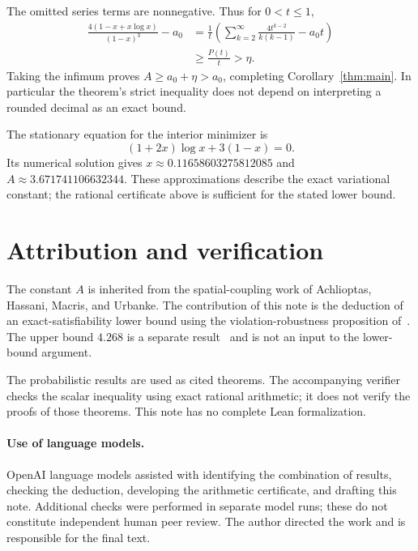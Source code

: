 \documentclass[11pt]{article}
\begin{document}
The omitted series terms are nonnegative. Thus for $0<t\le1$,
\begin{align*}
 \frac{4(1-x+x\log x)}{(1-x)^3}-a_0
 &=\frac1t\left(
       \sum_{k=2}^{\infty}\frac{4t^{k-2}}{k(k-1)}-a_0t\right)\\
 &\ge\frac{P(t)}t>\eta.
\end{align*}
Taking the infimum proves $A\ge a_0+\eta>a_0$, completing
Corollary~\ref{thm:main}. In particular the theorem's strict inequality
does not depend on interpreting a rounded decimal as an exact bound.

The stationary equation for the interior minimizer is
\[
 (1+2x)\log x+3(1-x)=0.
\]
Its numerical solution gives $x\approx0.11658603275812085$ and
$A\approx3.671741106632344$. These approximations describe the exact
variational constant; the rational certificate above is sufficient
for the stated lower bound.

\section{Attribution and verification}
The constant $A$ is inherited from the spatial-coupling work of
Achlioptas, Hassani, Macris, and Urbanke. The contribution of this note
is the deduction of an exact-satisfiability lower bound using the
violation-robustness proposition of~\cite{OpenAI}. The upper bound
$4.268$ is a separate result~\cite{Vorobyev} and is not an input to
the lower-bound argument.

The probabilistic results are used as cited theorems. The accompanying
verifier checks the scalar inequality using exact rational arithmetic;
it does not verify the proofs of those theorems. This note has no
complete Lean formalization.

\paragraph{Use of language models.}
OpenAI language models assisted with identifying the combination of
results, checking the deduction, developing the arithmetic certificate,
and drafting this note. Additional checks were performed in separate
model runs; these do not constitute independent human peer review.
The author directed the work and is responsible for the final text.
\end{document}
